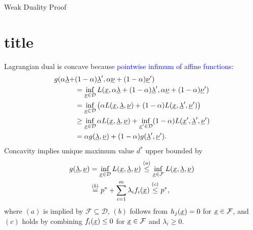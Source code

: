 \documentclass[10pt,english,aspectratio=169]{beamer}
\begin{document}
\begin{frame}{Weak Duality Proof}
\part{title}
Lagrangian dual is concave because \textcolor{blue}{pointwise infimum of affine functions}:\vspace{-1mm}
\begin{align*}
g(\alpha\vecnot{\lambda}+&(1-\alpha)\vecnot{\lambda}',\alpha\vecnot{\nu}+(1-\alpha)\vecnot{\nu}') \\
&= \inf_{\vecnot{x}\in \mathcal{D}} L(\vecnot{x},\alpha\vecnot{\lambda}+(1-\alpha)\vecnot{\lambda}',\alpha\vecnot{\nu}+(1-\alpha) \vecnot{\nu}') \\
&= \inf_{\vecnot{x}\in \mathcal{D}} \big( \alpha L(\vecnot{x},\vecnot{\lambda},\vecnot{\nu}) + (1-\alpha) L(\vecnot{x},\vecnot{\lambda}',\vecnot{\nu}') \big) \\
&\geq \inf_{\vecnot{x}\in \mathcal{D}} \alpha L(\vecnot{x},\vecnot{\lambda},\vecnot{\nu}) + \inf_{\vecnot{x}'\in \mathcal{D}} (1-\alpha) L(\vecnot{x}',\vecnot{\lambda}',\vecnot{\nu}') \\
&= \alpha g(\vecnot{\lambda},\vecnot{\nu}) + (1-\alpha) g(\vecnot{\lambda}',\vecnot{\nu}'). \vspace{-1mm}
\end{align*}
Concavity implies unique maximum value $d^*$ upper bounded by \vspace{-2mm}
\begin{align*}
g(\vecnot{\lambda},\vecnot{\nu})
&= \inf_{\vecnot{x}\in \mathcal{D}} L(\vecnot{x},\vecnot{\lambda},\vecnot{\nu})
\stackrel{(a)}{\leq} \inf_{\vecnot{x}\in \mathcal{F}} L(\vecnot{x},\vecnot{\lambda},\vecnot{\nu}) \\
&\stackrel{(b)}{=} p^* + \sum_{i=1}^m \lambda_i f_i (\vecnot{x})
\stackrel{(c)}{\leq} p^*, \vspace{-3mm}
\end{align*}
where $(a)$ is implied by $\mathcal{F} \subseteq \mathcal{D}$, $(b)$ follows from $h_j(\underline{x}) = 0$ for $\underline{x}\in \mathcal{F}$, and $(c)$ holds by combining $f_i(\underline{x}) \leq 0$ for $\underline{x}\in \mathcal{F}$ and $\lambda_i \geq 0$.

\end{frame}
\end{document}
